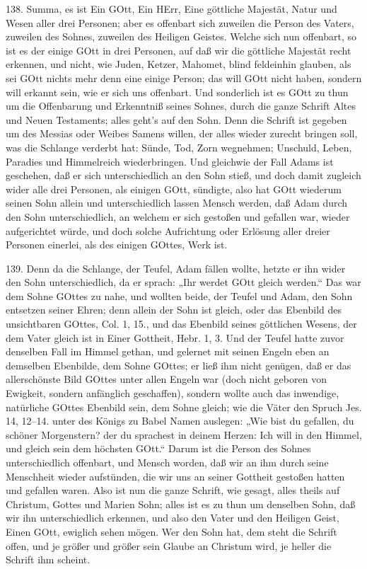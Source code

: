 138. Summa, es ist Ein GOtt, Ein HErr, Eine göttliche Majestät, Natur und Wesen aller drei Personen; aber es offenbart sich zuweilen die Person des Vaters, zuweilen des Sohnes, zuweilen des Heiligen Geistes. Welche sich nun offenbart, so ist es der einige GOtt in drei Personen, auf daß wir die göttliche Majestät recht erkennen, und nicht, wie Juden, Ketzer, Mahomet, blind feldeinhin glauben, als sei GOtt nichts mehr denn eine einige Person; das will GOtt nicht haben, sondern will erkannt sein, wie er sich uns offenbart. Und sonderlich ist es GOtt zu thun um die Offenbarung und Erkenntniß seines Sohnes, durch die ganze Schrift Altes und Neuen Testaments; alles geht’s auf den Sohn. Denn die Schrift ist gegeben um des Messias oder Weibes Samens willen, der alles wieder zurecht bringen soll, was die Schlange verderbt hat: Sünde, Tod, Zorn wegnehmen; Unschuld, Leben, Paradies und Himmelreich wiederbringen. Und gleichwie der Fall Adams ist geschehen, daß er sich unterschiedlich an den Sohn stieß, und doch damit zugleich wider alle drei Personen, als einigen GOtt, sündigte, also hat GOtt wiederum seinen Sohn allein und unterschiedlich lassen Mensch werden, daß Adam durch den Sohn unterschiedlich, an welchem er sich gestoßen und gefallen war, wieder aufgerichtet würde, und doch solche Aufrichtung oder Erlösung aller dreier Personen einerlei, als des einigen GOttes, Werk ist.

139. Denn da die Schlange, der Teufel, Adam fällen wollte, hetzte er ihn wider den Sohn unterschiedlich, da er sprach: „Ihr werdet GOtt gleich werden.“ Das war dem Sohne GOttes zu nahe, und wollten beide, der Teufel und Adam, den Sohn entsetzen seiner Ehren; denn allein der Sohn ist gleich, oder das Ebenbild des unsichtbaren GOttes, Col. 1, 15., und das Ebenbild seines göttlichen Wesens, der dem Vater gleich ist in Einer Gottheit, Hebr. 1, 3. Und der Teufel hatte zuvor denselben Fall im Himmel gethan, und gelernet mit seinen Engeln eben an demselben Ebenbilde, dem Sohne GOttes; er ließ ihm nicht genügen, daß er das allerschönste Bild GOttes unter allen Engeln war (doch nicht geboren von Ewigkeit, sondern anfänglich geschaffen), sondern wollte auch das inwendige, natürliche GOttes Ebenbild sein, dem Sohne gleich; wie die Väter den Spruch Jes. 14, 12–14. unter des Königs zu Babel Namen auslegen: „Wie bist du gefallen, du schöner Morgenstern? der du sprachest in deinem Herzen: Ich will in den Himmel, und gleich sein dem höchsten GOtt.“ Darum ist die Person des Sohnes unterschiedlich offenbart, und Mensch worden, daß wir an ihm durch seine Menschheit wieder aufstünden, die wir uns an seiner Gottheit gestoßen hatten und gefallen waren. Also ist nun die ganze Schrift, wie gesagt, alles theils auf Christum, Gottes und Marien Sohn; alles ist es zu thun um denselben Sohn, daß wir ihn unterschiedlich erkennen, und also den Vater und den Heiligen Geist, Einen GOtt, ewiglich sehen mögen. Wer den Sohn hat, dem steht die Schrift offen, und je größer und größer sein Glaube an Christum wird, je heller die Schrift ihm scheint.

